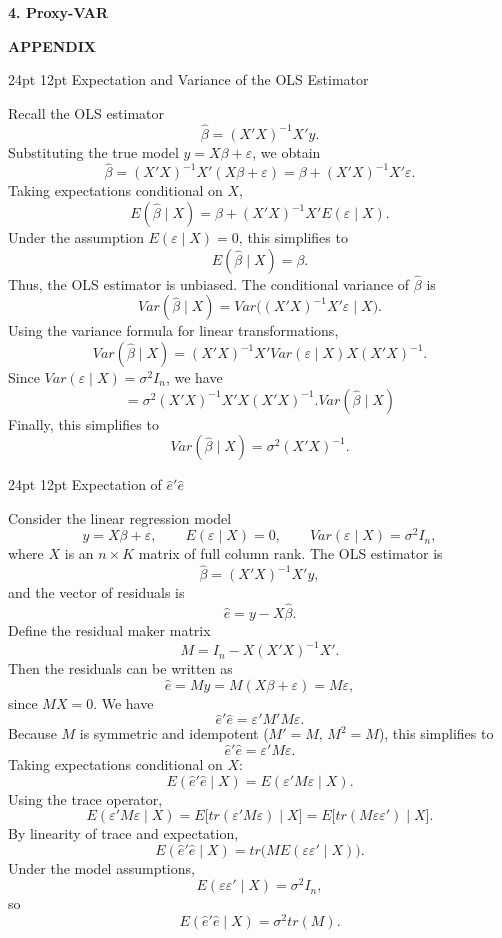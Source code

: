 \documentclass[a4paper, 12pt]{article}
\makeatletter
\renewcommand\section{\@startsection{section}{1}{\z@}%
                                      {24pt}%
                                      {12pt}%
                                      {\normalsize\bfseries}}
\makeatother
\begin{document}
\begin{center}
\textbf{4. Proxy-VAR}
\end{center}

\newpage
\thispagestyle{empty}

\vspace*{\fill}
\begin{center}
\textbf{APPENDIX}
\end{center}
\vspace*{\fill}

\newpage
\appendix

\section{Expectation and Variance of the OLS Estimator} \label{app:varb}

\noindent Recall the OLS estimator
\[
\hat\beta = (X'X)^{-1}X'y.
\]
Substituting the true model $y = X\beta + \varepsilon$, we obtain
\[
\hat\beta
= (X'X)^{-1}X'(X\beta + \varepsilon)
= \beta + (X'X)^{-1}X'\varepsilon.
\]
Taking expectations conditional on $X$,
\[
E(\hat\beta \mid X)
= \beta + (X'X)^{-1}X' E(\varepsilon \mid X).
\]
Under the assumption $E(\varepsilon \mid X)=0$, this simplifies to
\[
E(\hat\beta \mid X) = \beta.
\]
Thus, the OLS estimator is unbiased. The conditional variance of $\hat\beta$ is
\[
Var(\hat\beta \mid X)
= Var\big( (X'X)^{-1}X'\varepsilon \mid X \big).
\]
Using the variance formula for linear transformations,
\[
Var(\hat\beta \mid X)
= (X'X)^{-1}X' Var(\varepsilon \mid X) X (X'X)^{-1}.
\]
Since $Var(\varepsilon \mid X) = \sigma^2 I_n$, we have
\[
    = \sigma^2 (X'X)^{-1}X'X (X'X)^{-1}.
    Var(\hat\beta \mid X)
\]
Finally, this simplifies to
\[
Var(\hat\beta \mid X)
= \sigma^2 (X'X)^{-1}.
\]

\section{Expectation of \texorpdfstring{$\hat e'\hat e$}{e'e}} \label{app:vare}

\noindent Consider the linear regression model
\[
y = X\beta + \varepsilon, \qquad E(\varepsilon \mid X)=0, \qquad Var(\varepsilon \mid X)=\sigma^2 I_n,
\]
where $X$ is an $n \times K$ matrix of full column rank.
The OLS estimator is
\[
\hat\beta = (X'X)^{-1}X'y,
\]
and the vector of residuals is
\[
\hat e = y - X\hat\beta.
\]
Define the residual maker matrix
\[
M = I_n - X(X'X)^{-1}X'.
\]
Then the residuals can be written as
\[
\hat e = My = M(X\beta + \varepsilon) = M\varepsilon,
\]
since $MX = 0$.
We have
\[
\hat e'\hat e = \varepsilon' M' M \varepsilon.
\]
Because $M$ is symmetric and idempotent ($M'=M$, $M^2=M$), this simplifies to
\[
\hat e'\hat e = \varepsilon' M \varepsilon.
\]
Taking expectations conditional on $X$:
\[
E(\hat e'\hat e \mid X)
= E(\varepsilon' M \varepsilon \mid X).
\]
Using the trace operator,
\[
E(\varepsilon' M \varepsilon \mid X)
= E\big[tr(\varepsilon' M \varepsilon) \mid X\big]
= E\big[tr(M \varepsilon \varepsilon') \mid X\big].
\]
By linearity of trace and expectation,
\[
E(\hat e'\hat e \mid X)
= tr\big(M E(\varepsilon \varepsilon' \mid X)\big).
\]
Under the model assumptions,
\[
E(\varepsilon \varepsilon' \mid X) = \sigma^2 I_n,
\]
so
\[
E(\hat e'\hat e \mid X)
= \sigma^2 tr(M).
\]
\end{document}
